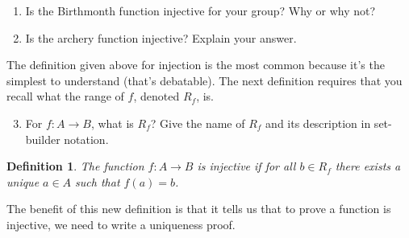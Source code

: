 \documentclass[12 pt]{article}
\theoremstyle{definition}
\theoremstyle{plain}
\theoremstyle{mytheorem}
\theoremstyle{myexample}
\theoremstyle{mydefinition}
\newtheorem*{definition*}{Definition}
\begin{document}
\begin{enumerate}
\item Is the Birthmonth function injective for your group?  Why or why not?

\vspace{2in}

\item Is the archery function injective?  Explain your answer.

\vspace{2in}
\end{enumerate}

The definition given above for injection is the most common because it's the simplest to understand (that's debatable).  The next definition requires that you recall what the range of $f$, denoted $R_f$, is.

\begin{enumerate} \setcounter{enumi}{2}
\item For $f: A \to B$, what is $R_f$?  Give the name of $R_f$ and its description in set-builder notation.

\vspace{2in}

\end{enumerate}

\begin{definition*}  The function $f: A \to B$ is \textit{injective} if for all $b \in R_f$ there exists a unique $a \in A$ such that $f(a)=b$.
\end{definition*}

The benefit of this new definition is that it tells us that to prove a function is injective, we need to write a uniqueness proof.
\end{document}
